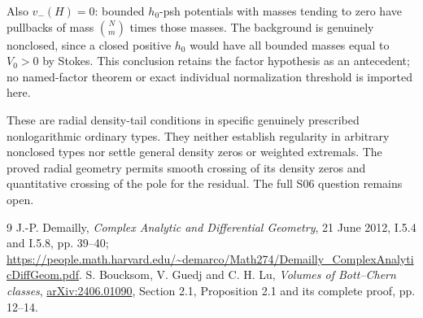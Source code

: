 \documentclass[11pt]{article}
\theoremstyle{remark}\newtheorem{remark}[theorem]{Remark}
\begin{document}
Also $v_-(H)=0$: bounded $h_0$-psh potentials with masses tending
to zero have pullbacks of mass $\binom Nm$ times those masses.
The background is genuinely nonclosed, since a closed positive
$h_0$ would have all bounded masses equal to $V_0>0$ by Stokes.
This conclusion retains the factor hypothesis as an antecedent;
no named-factor theorem or exact individual normalization threshold
is imported here.

These are radial density-tail conditions in specific genuinely
prescribed nonlogarithmic ordinary types. They neither establish
regularity in arbitrary nonclosed types nor settle general density
zeros or weighted extremals. The proved radial geometry permits smooth
crossing of its density zeros and quantitative crossing of the pole
for the residual. The full S06 question remains open.

\begin{thebibliography}{9}
 J.-P. Demailly,
\emph{Complex Analytic and Differential Geometry}, 21 June 2012,
I.5.4 and I.5.8, pp. 39--40;
\url{https://people.math.harvard.edu/~demarco/Math274/Demailly_ComplexAnalyticDiffGeom.pdf}.
 S. Boucksom, V. Guedj and C. H. Lu,
\emph{Volumes of Bott--Chern classes},
\href{https://arxiv.org/abs/2406.01090}{arXiv:2406.01090},
Section 2.1, Proposition 2.1 and its complete proof, pp. 12--14.
\end{thebibliography}
\end{document}
